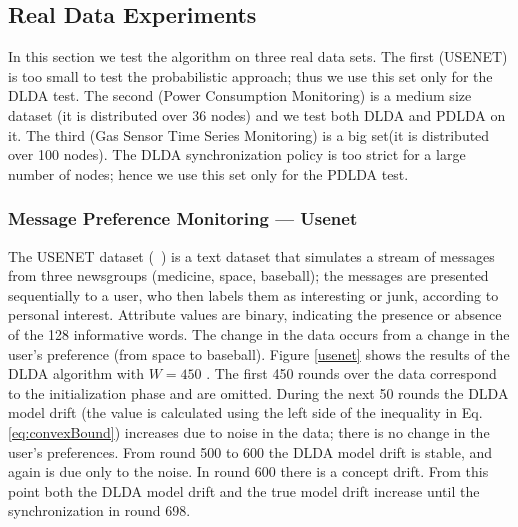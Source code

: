 \documentclass{vldb}
\begin{document}
\subsection{Real Data Experiments}
In this section we test the algorithm on three real data sets. The first
(USENET) is too small to test the probabilistic approach; thus we use this set only for the DLDA test.
The second (Power Consumption Monitoring) is a medium size dataset (it
is distributed over 36 nodes) and we test both DLDA and PDLDA on it.
The third (Gas Sensor Time Series Monitoring) is a big set(it is distributed over
100 nodes). The DLDA synchronization policy is too strict for a large number of nodes; hence we use this set only for the PDLDA test.

\subsubsection{Message Preference Monitoring --- Usenet}
The USENET dataset (~\citealt{usenet}) is a text dataset that simulates a stream of messages 
from three newsgroups (medicine, space, baseball); 
the messages are presented sequentially to a user, who then labels them as interesting or junk, 
according to personal interest. 
Attribute values are binary, indicating the presence or absence of the 128 informative words. 
The change in the data occurs from a change in the user's preference (from space to baseball). 
Figure \ref{usenet} shows the results of the DLDA algorithm with $W=450$ . The first 450 rounds over the data correspond to
the initialization phase and are omitted. During the next 50 rounds the DLDA model drift 
(the value is calculated using the left side of the inequality in Eq. \ref{eq:convexBound}) 
increases due to noise in the data; there is no change in the user's
preferences.
From round 500 to 600 the DLDA model drift is stable, and again is due only to the noise. In round 600 there is a concept
drift.
From this point both the DLDA model drift and the true model drift increase until the synchronization in round 698.
\end{document}
